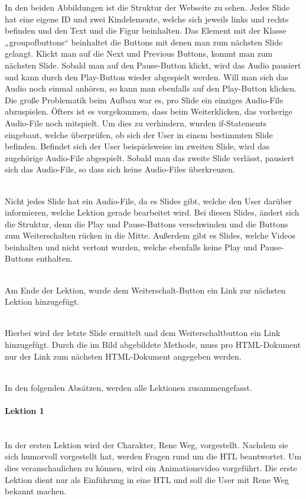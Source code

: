 In den beiden Abbildungen ist die Struktur der Webseite zu sehen. Jedes Slide hat eine eigene ID und zwei Kindelemente, welche sich jeweils links und rechts befinden und den Text und die Figur beinhalten. Das Element mit der Klasse „groupofbuttons“ beinhaltet die Buttons mit denen man zum nächsten Slide gelangt. Klickt man auf die Next und Previous Buttons, kommt man zum nächsten Slide. Sobald man auf den Pause-Button klickt, wird das Audio pausiert und kann durch den Play-Button wieder abgespielt werden. Will man sich das Audio noch einmal anhören, so kann man ebenfalls auf den Play-Button klicken. Die große Problematik beim Aufbau war es, pro Slide ein einziges Audio-File abzuspielen. Öfters ist es vorgekommen, dass beim Weiterklicken, das vorherige Audio-File noch mitspielt. Um dies zu verhindern, wurden if-Statements eingebaut, welche überprüfen, ob sich der User in einem bestimmten Slide befinden. Befindet sich der User beispielsweise im zweiten Slide, wird das zugehörige Audio-File abgespielt. Sobald man das zweite Slide verlässt, pausiert sich das Audio-File, so dass sich keine Audio-Files überkreuzen. 

\leavevmode \\

Nicht jedes Slide hat ein Audio-File, da es Slides gibt, welche den User darüber informieren, welche Lektion gerade bearbeitet wird. Bei diesen Slides, ändert sich die Struktur, denn die Play und Pause-Buttons verschwinden und die Buttons zum Weiterschalten rücken in die Mitte. Außerdem gibt es Slides, welche Videos beinhalten und nicht vertont wurden, welche ebenfalls keine Play und Pause-Buttons enthalten. 

\leavevmode \\ 

Am Ende der Lektion, wurde dem Weiterschalt-Button ein Link zur nächsten Lektion hinzugefügt. 

\leavevmode \\

Hierbei wird der letzte Slide ermittelt und dem Weiterschaltbutton ein Link hinzugefügt. Durch die im Bild abgebildete Methode, muss pro HTML-Dokument nur der Link zum nächsten HTML-Dokument angegeben werden. 

\leavevmode \\

In den folgenden Absätzen, werden alle Lektionen zusammengefasst.
\paragraph{Lektion 1}
\leavevmode \\
In der ersten Lektion wird der Charakter, Rene Weg, vorgestellt. Nachdem sie sich humorvoll vorgestellt hat, werden Fragen rund um die HTL beantwortet. Um dies veranschaulichen zu können, wird ein Animationsvideo vorgeführt. Die erste Lektion dient nur als Einführung in eine HTL und soll die User mit Rene Weg bekannt machen. 


